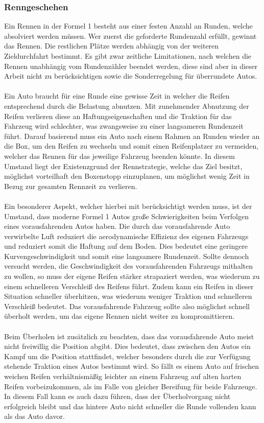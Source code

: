 \subsubsection{Renngeschehen}\label{sec:race_behaviour} %
Ein Rennen in der Formel 1 besteht aus einer festen Anzahl an Runden, welche absolviert werden müssen. Wer zuerst die geforderte Rundenzahl erfüllt, gewinnt das Rennen. Die restlichen Plätze werden abhängig von der weiteren Zieldurchfahrt bestimmt. Es gibt zwar zeitliche Limitationen, nach welchen die Rennen unabhängig vom Rundenzähler beendet werden, diese sind aber in dieser Arbeit nicht zu berücksichtigen sowie die Sonderregelung für überrundete Autos.\\\\
Ein Auto braucht für eine Runde eine gewisse Zeit in welcher die Reifen entsprechend durch die Belastung abnutzen. Mit zunehmender Abnutzung der Reifen verlieren diese an Haftungseigenschaften und die Traktion für das Fahrzeug wird schlechter, was zwangsweise zu einer langsameren Rundenzeit führt. Darauf basierend muss ein Auto nach einem Rahmen an Runden wieder an die Box, um den Reifen zu wechseln und somit einen Reifenplatzer zu vermeiden, welcher das Rennen für das jeweilige Fahrzeug beenden könnte. In diesem Umstand liegt der Existenzgrund der Rennstrategie, welche das Ziel besitzt, möglichst vorteilhaft den Boxenstopp einzuplanen, um möglichst wenig Zeit in Bezug zur gesamten Rennzeit zu verlieren.\\\\
Ein besonderer Aspekt, welcher hierbei mit berücksichtigt werden muss, ist der Umstand, dass moderne Formel 1 Autos große Schwierigkeiten beim Verfolgen eines vorausfahrenden Autos haben. Die durch das vorausfahrende Auto verwirbelte Luft reduziert die aerodynamische Effizienz des eigenen Fahrzeugs und reduziert somit die Haftung auf dem Boden. Dies bedeutet eine geringere Kurvengeschwindigkeit und somit eine langsamere Rundenzeit. Sollte dennoch versucht werden, die Geschwindigkeit des vorausfahrenden Fahrzeugs mithalten zu wollen, so muss der eigene Reifen stärker strapaziert werden, was wiederum zu einem schnelleren Verschleiß des Reifens führt. Zudem kann ein Reifen in dieser Situation schneller überhitzen, was wiederum weniger Traktion und schnelleren Verschleiß bedeutet. Das vorausfahrende Fahrzeug sollte also möglichst schnell überholt werden, um das eigene Rennen nicht weiter zu kompromittieren.\\\\
Beim Überholen ist zusätzlich zu beachten, dass das vorausfahrende Auto meist nicht freiwillig die Position abgibt. Dies bedeutet, dass zwischen den Autos ein Kampf um die Position stattfindet, welcher besonders durch die zur Verfügung stehende Traktion eines Autos bestimmt wird. So fällt es einem Auto auf frischen weichen Reifen verhältnismäßig leichter an einem Fahrzeug auf alten harten Reifen vorbeizukommen, als im Falle von gleicher Bereifung für beide Fahrzeuge. In diesem Fall kann es auch dazu führen, dass der Überholvorgang nicht erfolgreich bleibt und das hintere Auto nicht schneller die Runde vollenden kann als das Auto davor.

